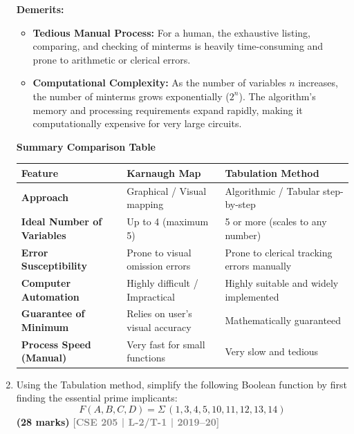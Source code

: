 \documentclass[12pt,a3paper]{article}
\newcommand{\yr}[1]{\hfill\textcolor{gray}{\small\textbf{[#1]}}}
\newcommand{\mk}[1]{\textcolor{orange!70!black}{\small\textbf{(#1 marks)}}}
\begin{document}
\begin{enumerate}
\begin{tcolorbox}[enhanced,breakable,ansbox,colback=cC!4,colframe=cC,boxrule=0.8pt,arc=5pt,title={\textbf{Answer}},fonttitle=\bfseries\color{white},colbacktitle=cC]
\textbf{Demerits:}
\begin{itemize}
    \item \textbf{Tedious Manual Process:} For a human, the exhaustive listing, comparing, and checking of minterms is heavily time-consuming and prone to arithmetic or clerical errors.
    \item \textbf{Computational Complexity:} As the number of variables $n$ increases, the number of minterms grows exponentially ($2^n$). The algorithm's memory and processing requirements expand rapidly, making it computationally expensive for very large circuits.
\end{itemize}

\vspace{1em}
\textbf{\large Summary Comparison Table}

\begin{center}
\renewcommand{\arraystretch}{1.3}
\begin{tabular}{p{} p{} p{}}
\toprule
\textbf{Feature} & \textbf{Karnaugh Map} & \textbf{Tabulation Method} \\
\midrule
\textbf{Approach} & Graphical / Visual mapping & Algorithmic / Tabular step-by-step \\
\textbf{Ideal Number of Variables} & Up to 4 (maximum 5) & 5 or more (scales to any number) \\
\textbf{Error Susceptibility} & Prone to visual omission errors & Prone to clerical tracking errors manually \\
\textbf{Computer Automation} & Highly difficult / Impractical & Highly suitable and widely implemented \\
\textbf{Guarantee of Minimum} & Relies on user's visual accuracy & Mathematically guaranteed \\
\textbf{Process Speed (Manual)} & Very fast for small functions & Very slow and tedious \\
\bottomrule
\end{tabular}
\end{center}

\end{tcolorbox}

\item Using the Tabulation method, simplify the following Boolean function by first finding the essential prime implicants:
\[ F(A,B,C,D) = \Sigma\,(1,3,4,5,10,11,12,13,14) \]
\mk{28} \yr{CSE 205 | L-2/T-1 | 2019--20}

\begin{tcolorbox}[enhanced,breakable,ansbox,colback=cC!4,colframe=cC,boxrule=0.8pt,arc=5pt,title={\textbf{Answer}},fonttitle=\bfseries\color{white},colbacktitle=cC]


\end{tcolorbox}
\end{enumerate}
\end{document}
